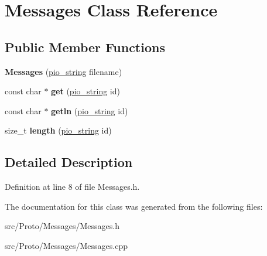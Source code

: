 \hypertarget{class_messages}{
\section{Messages Class Reference}
\label{class_messages}
}
\subsection*{Public Member Functions}
\begin{DoxyCompactItemize}
\item 
\hypertarget{class_messages_a5c506241921ab4d7b38a9666d84890aa}{
{\bfseries Messages} (\hyperlink{classpio__string}{pio\_\-string} filename)}
\label{class_messages_a5c506241921ab4d7b38a9666d84890aa}

\item 
\hypertarget{class_messages_abd3ed2ec867047c4986eb33506e6133d}{
const char $\ast$ {\bfseries get} (\hyperlink{classpio__string}{pio\_\-string} id)}
\label{class_messages_abd3ed2ec867047c4986eb33506e6133d}

\item 
\hypertarget{class_messages_ac4ae33f2b8eca43afbb7541737ea396d}{
const char $\ast$ {\bfseries getln} (\hyperlink{classpio__string}{pio\_\-string} id)}
\label{class_messages_ac4ae33f2b8eca43afbb7541737ea396d}

\item 
\hypertarget{class_messages_a68b61d23b13e47107455dd235749c0a9}{
size\_\-t {\bfseries length} (\hyperlink{classpio__string}{pio\_\-string} id)}
\label{class_messages_a68b61d23b13e47107455dd235749c0a9}

\end{DoxyCompactItemize}


\subsection{Detailed Description}


Definition at line 8 of file Messages.h.



The documentation for this class was generated from the following files:\begin{DoxyCompactItemize}
\item 
src/Proto/Messages/Messages.h\item 
src/Proto/Messages/Messages.cpp\end{DoxyCompactItemize}
